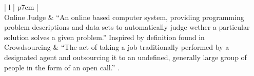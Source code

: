 \begin{table}[t!]
    \centering
    \begin{tabular}{ | l | p{7cm} | }
    \hline
     \\
    \hline
    Online Judge & ``An online based computer system, providing programming problem descriptions and data sets to automatically judge wether a particular solution solves a given problem.'' Inspired by definition found in \cite{a:Kurnia2001}  \\ \hline
    Crowdsourcing & ``The act of taking a job traditionally performed by a designated agent and outsourcing it to an undefined, generally large group of people in the form of an open call.'' \cite{CROWDSOURCING}. \\ \hline
    \end{tabular}
    \caption[Defining Online Judges and Crowdsourcing]{Defining \glspl{oj} and Crowdsourcing.}
    \label{tab:definitions}
\end{table}
